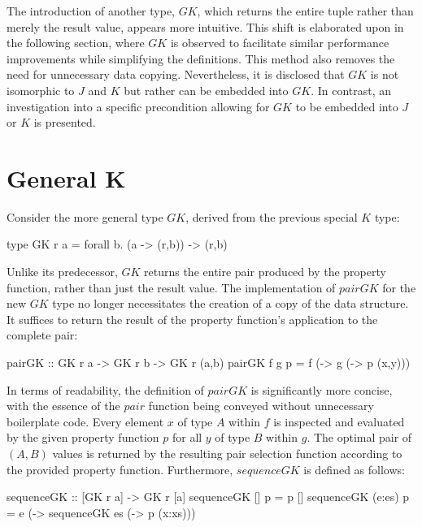\documentclass[runningheads]{llncs}
\begin{document}
The introduction of another type, \(GK\), which returns the entire tuple
rather than merely the result value, appears more intuitive. This shift
is elaborated upon in the following section, where \(GK\) is observed to
facilitate similar performance improvements while simplifying the
definitions. This method also removes the need for unnecessary data
copying. Nevertheless, it is disclosed that \(GK\) is not isomorphic to
\(J\) and \(K\) but rather can be embedded into \(GK\). In contrast, an
investigation into a specific precondition allowing for \(GK\) to be
embedded into \(J\) or \(K\) is presented.

\section{General K}\label{general-k}

Consider the more general type \(GK\), derived from the previous special
\(K\) type:

\begin{code}
type GK r a = forall b. (a -> (r,b)) -> (r,b)
\end{code}

Unlike its predecessor, \(GK\) returns the entire pair produced by the
property function, rather than just the result value. The implementation
of \(pairGK\) for the new \(GK\) type no longer necessitates the
creation of a copy of the data structure. It suffices to return the
result of the property function's application to the complete pair:

\begin{code}
pairGK :: GK r a -> GK r b -> GK r (a,b)
pairGK f g p = f (\x -> g (\y -> p (x,y)))
\end{code}

In terms of readability, the definition of \(pairGK\) is significantly
more concise, with the essence of the \(pair\) function being conveyed
without unnecessary boilerplate code. Every element \(x\) of type \(A\)
within \(f\) is inspected and evaluated by the given property function
\(p\) for all \(y\) of type \(B\) within \(g\). The optimal pair of
\((A,B)\) values is returned by the resulting pair selection function
according to the provided property function. Furthermore, \(sequenceGK\)
is defined as follows:

\begin{code}
sequenceGK :: [GK r a] -> GK r [a]
sequenceGK [] p     = p []
sequenceGK (e:es) p = e (\x  -> sequenceGK es 
                        (\xs -> p (x:xs)))
\end{code}
\end{document}
